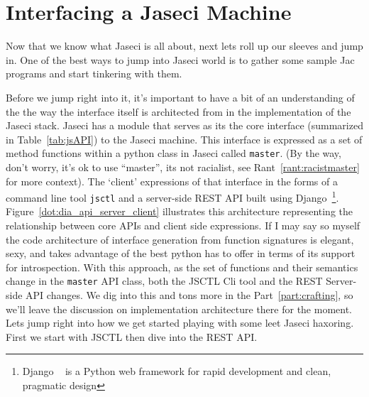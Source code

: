 \chapter{Interfacing a Jaseci Machine}
Now that we know what Jaseci is all about, next lets roll up our sleeves and jump in. One of the best ways to jump into Jaseci world is to gather some sample Jac programs and start tinkering with them.
\par
Before we jump right into it, it's important to have a bit of an understanding of the the way the interface itself is architected from in the implementation of the Jaseci stack. Jaseci has a module that serves as its  the core interface (summarized in Table~\ref{tab:jsAPI}) to the Jaseci machine. This interface is expressed as a set of method functions within a python class in Jaseci  called \texttt{master}. (By the way, don't worry, it's ok to use ``master'', its not racialist, see Rant~\ref{rant:racistmaster} for more context). The `client' expressions of that interface in the forms of a command line tool \texttt{jsctl} and a server-side REST API built using Django~\footnote{Django ~\cite{django} is a Python web framework for rapid development and clean, pragmatic design}. Figure~\ref{dot:dia_api_server_client} illustrates this architecture representing the relationship between core APIs and client side expressions.
\printtabJSAPI
If I may say so myself the code architecture of interface generation from function signatures is elegant, sexy, and takes advantage of the best python has to offer in terms of its support for introspection. With this approach, as the set of functions and their semantics change in the \texttt{master} API class, both the JSCTL Cli tool and the REST Server-side API changes. We dig into this and tons more in the Part~\ref{part:crafting}, so we'll leave the discussion on implementation architecture there for the moment. Lets jump right into how we get started playing with some \gls{leet} Jaseci \gls{haxor}ing. First we start with JSCTL then dive into the REST API.


